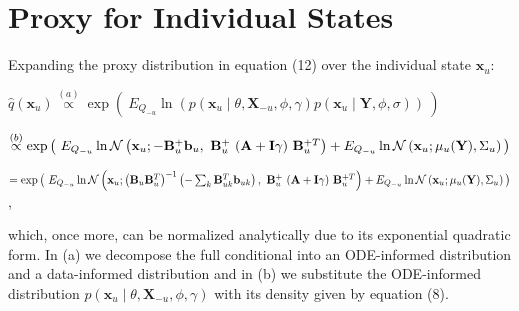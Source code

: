 \section{Proxy for Individual States}
\begin{par}
Expanding the proxy distribution in equation (12) over the individual state $\mathbf{x}_u$:
\end{par} \vspace{1em}
\begin{par}
$\hat{q}(\mathbf{x}_u) \stackrel{(a)}{\propto} \exp \left( ~ E_{Q_{-u}}  \ln ( p(\mathbf{x}_u \mid \theta, \mathbf{X}_{-u},\phi,\gamma) p(\mathbf{x}_u \mid\mathbf{Y},\phi,\sigma) ) ~ \right)$
\end{par} \vspace{1em}
\begin{par}
$\stackrel{(b)}{\propto} \exp\big( ~ E_{Q_{-u}} \ln \mathcal{N}\left(\mathbf{x}_u ; -\mathbf{B}_{u}^+ \mathbf{b}_u, ~\mathbf{B}_u^{+} ~ (\mathbf{A} + \mathbf{I}\gamma) ~ \mathbf{B}_u^{+T} \right) + E_{Q_{-u}} \ln \mathcal{N}\left(\mathbf{x}_u ; \boldmath\mu_u(\mathbf{Y}), \Sigma_u \right) \big)$
\end{par} \vspace{1em}
\begin{par}
$= \exp\big( ~ E_{Q_{-u}} \ln \mathcal{N}\left(\mathbf{x}_u ; \left( \mathbf{B}_{u} \mathbf{B}_{u}^T \right)^{-1} \left( - \sum_k \mathbf{B}_{uk}^T \mathbf{b}_{uk} \right), ~\mathbf{B}_{u}^{+} ~ (\mathbf{A} + \mathbf{I}\gamma) ~ \mathbf{B}_u^{+T} \right) + E_{Q_{-u}} \ln \mathcal{N}\left(\mathbf{x}_u ; \boldmath\mu_u(\mathbf{Y}), \Sigma_u \right) \big)$,
\end{par} \vspace{1em}
\begin{par}
which, once more, can be normalized analytically due to its exponential quadratic form. In (a) we decompose the full conditional into an ODE-informed distribution and a data-informed distribution and in (b) we substitute the ODE-informed distribution $p(\mathbf{x}_u \mid \theta, \mathbf{X}_{-u},\phi,\gamma)$ with its density given by equation (8).
\end{par} 